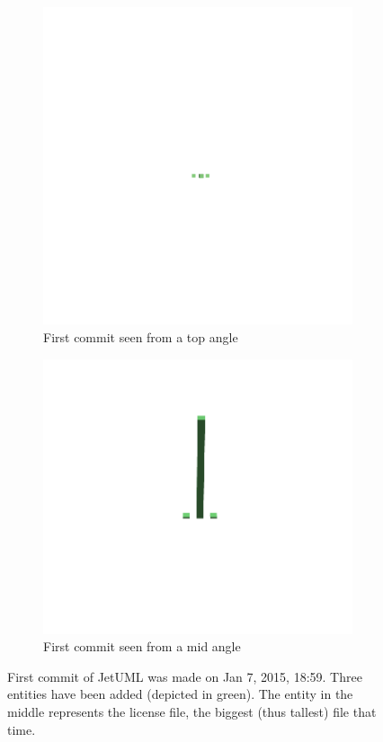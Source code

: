\begin{figure}[ht]
    \begin{subfigure}{0.42\textwidth}
        \includegraphics[width=\linewidth]{JetUML_V0S1.png}
        \caption{First commit seen from a top angle } 
        \label{fig:JetUML_V0S1_0}
    \end{subfigure}
    \hspace*{\fill}
    \begin{subfigure}{0.42\textwidth}
        \includegraphics[width=\linewidth]{JetUML_V0S1_1.png}
        \caption{First commit seen from a mid angle} 
        \label{fig:JetUML_V0S1_1}
    \end{subfigure}
    \caption{First commit of JetUML was made on Jan 7, 2015, 18:59. Three entities have been added (depicted in green). The entity in the middle represents the license file, the biggest (thus tallest) file that time.} 
    \label{fig:JetUML_V0S1}
\end{figure}

